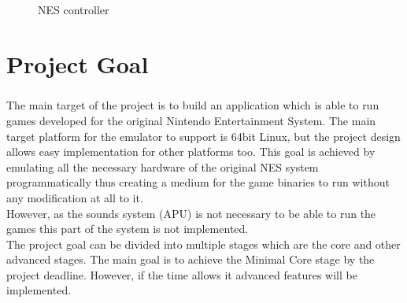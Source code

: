 \documentclass[]{report}
\begin{document}
\begin{figure}[!htb]
	\caption{\label{fig:my-label} NES controller}
\end{figure}
\clearpage



\chapter{Project Goal}
\paragraph{ }
The main target of the project is to build an application which is able to run games developed for the original Nintendo Entertainment System. The main target platform for the emulator to support is 64bit Linux, but the project design allows easy implementation for other platforms too. This goal is achieved by emulating all the necessary hardware of the original NES system programmatically thus creating a medium for the game binaries to run without any modification at all to it. 
\\ 
However, as the sounds system (APU) is not necessary to be able to run the games this part of the system is not implemented.
\\
The project goal can be divided into multiple stages which are the core and other advanced stages.
The main goal is to achieve the Minimal Core stage by the project deadline. However, if the time allows it advanced features will be implemented. 
\end{document}
